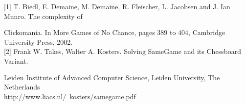 \documentclass[twoside]{article}
\begin{document}
\begin{multicols}{2}

\begin{thebibliography}{99} %

[1] T. Biedl, E. Demaine, M. Demaine, R. Fleischer, L. Jacobsen and J. Ian Munro. The complexity of

Clickomania. In More Games of No Chance, pages 389 to 404, Cambridge University Press, 2002.\\

[2] Frank W. Takes, Walter A. Kosters. Solving SameGame and its Chessboard Variant. 

Leiden Institute of Advanced Computer Science, Leiden University, The Netherlands\\

http://www.liacs.nl/~kosters/samegame.pdf

\end{thebibliography}


\end{multicols}
\end{document}
